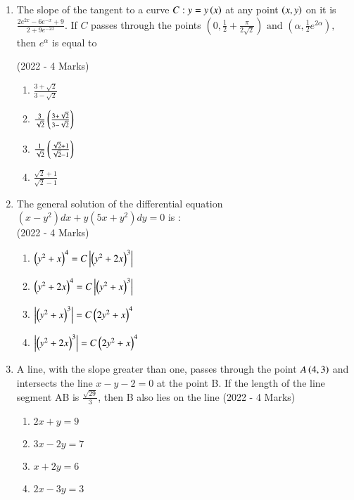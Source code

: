 \documentclass[journal]{IEEEtran}
\begin{document}
\begin{enumerate}
{        %
        
        }
    \item{
	           The slope of the tangent to a curve $C : y = y\left(x\right)$ at any point $\left(x, y\right)$ on it is $\frac{2e^{2x}-6e^{-x}+9}{2+9e^{-2x}}$. If $C$ passes through the points $\left(0, \frac{1}{2}+\frac{\pi}{2\sqrt{2}}\right)\text{ and }\left(\alpha,\frac{1}{2}e^{2\alpha}\right),$ then $ e^\alpha $ is equal to 
            
             \hfill
                {(2022 - 4 Marks)}
            \begin{multicols}{2}
                \begin{enumerate}
                	\item $\frac{3+\sqrt{2}}{3-\sqrt{2}}$
                	\item $\frac{3}{\sqrt{2}}\left(\frac{3+\sqrt{2}}{3-\sqrt{2}}\right)$
                	\item $\frac{1}{\sqrt{2}}\left(\frac{\sqrt{2}+1}{\sqrt{2}-1}\right)$
                	\item $\frac{\sqrt{2}+1}{\sqrt{2}-1}$
                \end{enumerate}
            \end{multicols}
        
        }
    \item{
    		The general solution of the differential equation $(x - y^2)dx + y(5x + y^2)dy = 0$ is :\\ \text{ }
             \hfill
                {(2022 - 4 Marks)}
			\begin{multicols}{2}
				\begin{enumerate}
					\item $\left(y^2+x\right)^4=C\left|\left(y^2+2x\right)^3\right|$
					\item $\left(y^2+2x\right)^4=C\left|\left(y^2+x\right)^3\right|$
					\item $\left|\left(y^2+x\right)^3\right|=C\left(2y^2+x\right)^4$
					\item $\left|\left(y^2+2x\right)^3\right|=C\left(2y^2+x\right)^4$
				\end{enumerate}
			\end{multicols}
        
        }
    \item{
        	A line, with the slope greater than one, passes through the point $A\left(4, 3\right)$ and intersects the line $x - y - 2 = 0$ at the point B. If the length of the line segment AB is $\frac{\sqrt{29}}{3}$, then B also lies on the line\hfill
                {(2022 - 4 Marks)}
				\begin{multicols}{4}
	                \begin{enumerate}
	                	\item $2x + y = 9$
	                	\item $3x - 2y = 7$
	                	\item $x + 2y = 6$
	                	\item $2x - 3y = 3$
	                \end{enumerate}
				\end{multicols}
        
}
\end{enumerate}
\end{document}

